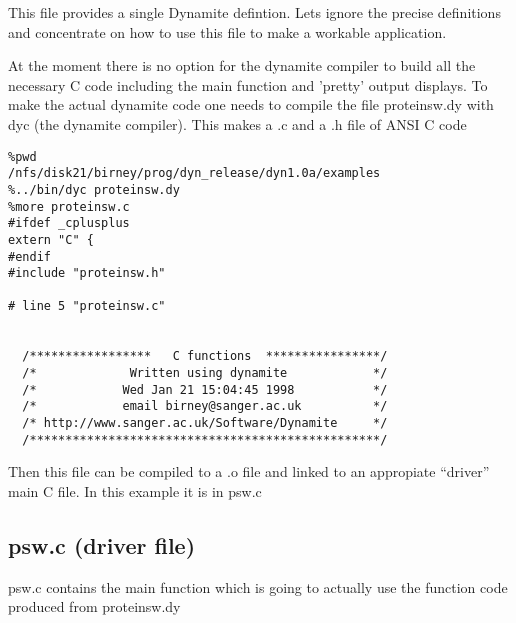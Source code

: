 This file provides a single Dynamite defintion. Lets ignore the precise
definitions and concentrate on how to use this file to make a workable
application.

At the moment there is no option for the dynamite compiler to build
all the necessary C code including the main function and 'pretty' output
displays. To make the actual dynamite code one needs to compile the file
proteinsw.dy with dyc (the dynamite compiler). This makes a .c and a .h file
of ANSI C code

\begin{verbatim}
%pwd
/nfs/disk21/birney/prog/dyn_release/dyn1.0a/examples
%../bin/dyc proteinsw.dy
%more proteinsw.c
#ifdef _cplusplus
extern "C" {
#endif
#include "proteinsw.h"

# line 5 "proteinsw.c"


  /*****************   C functions  ****************/
  /*             Written using dynamite            */
  /*            Wed Jan 21 15:04:45 1998           */
  /*            email birney@sanger.ac.uk          */
  /* http://www.sanger.ac.uk/Software/Dynamite     */
  /*************************************************/
\end{verbatim}

Then this file can be compiled to a .o file and linked to an appropiate
``driver'' main C file. In this example it is in psw.c

\subsection{psw.c (driver file)}
psw.c contains the main function which is going to actually
use the function code produced from proteinsw.dy



